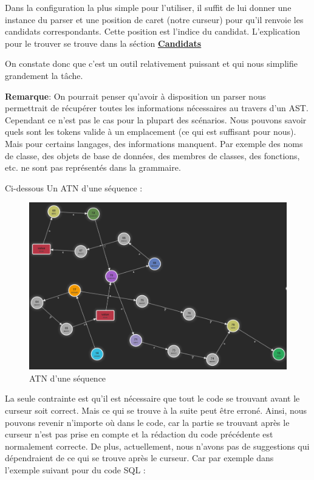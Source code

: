 \documentclass[
    iict, %
    il, %
]{heig-tb}
\begin{document}
Dans la configuration la plus simple pour l'utiliser, il suffit de lui donner une instance du parser et une position de caret (notre curseur) pour qu'il renvoie les candidats correspondants.
Cette position est l'indice du candidat. L'explication pour le trouver se trouve dans la séction \hyperref[candidates]{\textbf{Candidats}}

On constate donc que c'est un outil relativement puissant et qui nous simplifie grandement la tâche.

\textbf{Remarque}: On pourrait penser qu'avoir à disposition un parser nous permettrait de récupérer toutes les informations nécessaires au travers d'un AST. Cependant ce n'est pas le cas pour la plupart des scénarios.
Nous pouvons savoir quels sont les tokens valide à un emplacement (ce qui est suffisant pour nous). Mais pour certains langages, des informations manquent. Par exemple des noms de classe, des objets de base de données, des membres de classes, des fonctions, etc. ne sont pas représentés dans la grammaire. 

Ci-dessous Un ATN d'une séquence :

\begin{figure}[!ht]
    \begin{center}
        \includegraphics[width=12cm]{assets/figures/seq_ATN.png}
    \end{center}
    \caption[ATN d'une séquence]{\label{seq_ATN} ATN d'une séquence}
\end{figure}

La seule contrainte est qu'il est nécessaire que tout le code se trouvant avant le curseur soit correct. Mais ce qui se trouve à la suite peut être erroné.
Ainsi, nous pouvons revenir n'importe où dans le code, car la partie se trouvant après le curseur n'est pas prise en compte et la rédaction du code précédente est normalement correcte.
De plus, actuellement, nous n'avons pas de suggestions qui dépendraient de ce qui se trouve après le curseur.
Car par exemple dans l'exemple suivant pour du code SQL :
\end{document}
